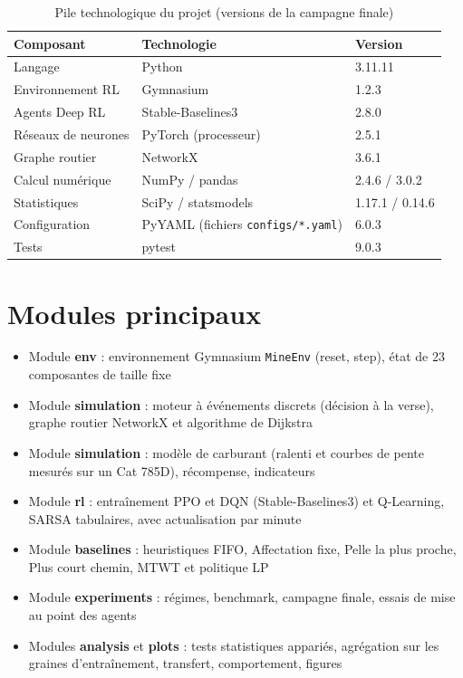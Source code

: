\documentclass[11pt,a4paper]{report}
\begin{document}
\begin{table}[H]
\centering
\caption{Pile technologique du projet (versions de la campagne finale)}
\begin{tabular}{lll}
\toprule
\textbf{Composant} & \textbf{Technologie} & \textbf{Version} \\
\midrule
Langage & Python & 3.11.11 \\
Environnement RL & Gymnasium & 1.2.3 \\
Agents Deep RL & Stable-Baselines3 & 2.8.0 \\
Réseaux de neurones & PyTorch (processeur) & 2.5.1 \\
Graphe routier & NetworkX & 3.6.1 \\
Calcul numérique & NumPy / pandas & 2.4.6 / 3.0.2 \\
Statistiques & SciPy / statsmodels & 1.17.1 / 0.14.6 \\
Configuration & PyYAML (fichiers \texttt{configs/*.yaml}) & 6.0.3 \\
Tests & pytest & 9.0.3 \\
\bottomrule
\end{tabular}
\end{table}

\section*{Modules principaux}

\begin{itemize}
    \item Module \textbf{env} : environnement Gymnasium \texttt{MineEnv} (reset, step), état de 23 composantes de taille fixe
    \item Module \textbf{simulation} : moteur à événements discrets (décision à la verse), graphe routier NetworkX et algorithme de Dijkstra
    \item Module \textbf{simulation} : modèle de carburant (ralenti et courbes de pente mesurés sur un Cat 785D), récompense, indicateurs
    \item Module \textbf{rl} : entraînement PPO et DQN (Stable-Baselines3) et Q-Learning, SARSA tabulaires, avec actualisation par minute
    \item Module \textbf{baselines} : heuristiques FIFO, Affectation fixe, Pelle la plus proche, Plus court chemin, MTWT et politique LP
    \item Module \textbf{experiments} : régimes, benchmark, campagne finale, essais de mise au point des agents
    \item Modules \textbf{analysis} et \textbf{plots} : tests statistiques appariés, agrégation sur les graines d'entraînement, transfert, comportement, figures
\end{itemize}
\end{document}
